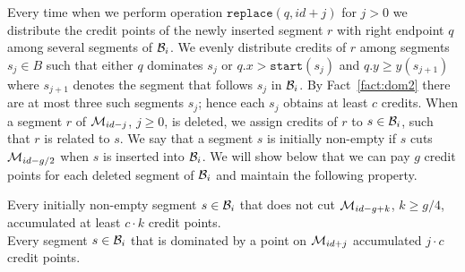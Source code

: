 \documentclass[10pt]{llncs}
\def\idtt#1{\ensuremath{\mathtt{#1}}}
\newcommand{\cM}{{\cal M}}
\newcommand{\cB}{{\cal B}}
\newcommand{\replace}{\idtt{replace}}
\newcommand{\sleft}{\idtt{start}}
\begin{document}
Every time when we perform operation $\replace(q,id+j)$ for 
$j>0$ we distribute the credit points of 
the newly inserted segment $r$ with right endpoint $q$ among several segments
of $\cB_i$. We evenly distribute credits of $r$ among segments 
$s_j\in B$ such that either $q$ dominates $s_j$ or $q.x> \sleft(s_j)$ 
and $q.y \geq y(s_{j+1})$ where $s_{j+1}$ denotes the segment 
that follows $s_j$ in $\cB_i$. By Fact~\ref{fact:dom2} there are at most 
three such segments $s_j$; hence each $s_j$ obtains at least $c$ credits. 
When a segment $r$ of $\cM_{id-j}$, $j\geq 0$, is deleted, 
we assign credits of $r$ to $s\in \cB_i$, such that $r$ is related 
to $s$. 
We say that a segment $s$ is initially non-empty if $s$ cuts 
$\cM_{id-g/2}$ when $s$ is inserted into $\cB_i$. We will 
show below that we can pay $g$ credit points for each deleted segment 
of $\cB_i$ and maintain the following property.
\begin{property}\label{prop:cred}
Every initially non-empty segment $s\in \cB_i$ 
that does not cut $\cM_{id-g+k}$, $k\geq g/4$, 
accumulated at least $c\cdot k$ credit points.\\ 
Every segment $s\in \cB_i$ that is dominated by a point on $\cM_{id+j}$ 
accumulated $j\cdot c$ credit points.
\end{property}
\end{document}
